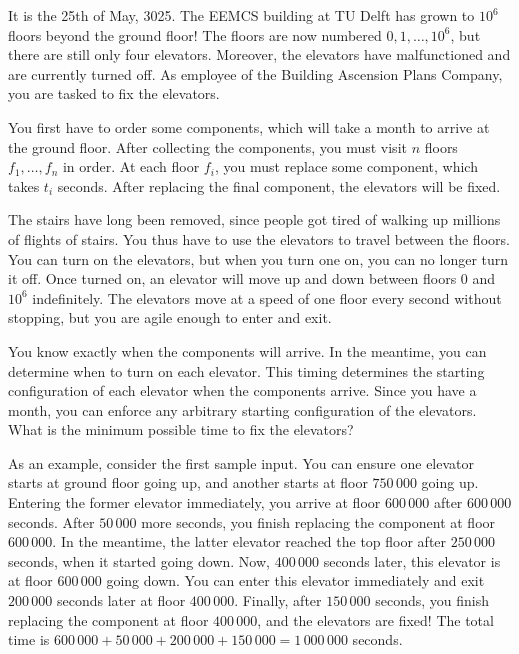 







It is the 25th of May, 3025.
The EEMCS building at TU Delft has grown to $10^6$ floors beyond the ground floor!
The floors are now numbered $0,1,\ldots,10^6$, but there are still only four elevators.
Moreover, the elevators have malfunctioned and are currently turned off.
As employee of the Building Ascension Plans Company, you are tasked to fix the elevators.

You first have to order some components, which will take a month to arrive at the ground floor.
After collecting the components, you must visit $n$ floors $f_1,\ldots,f_n$ in order.
At each floor $f_i$, you must replace some component, which takes $t_i$ seconds.
After replacing the final component, the elevators will be fixed.

The stairs have long been removed, since people got tired of walking up millions of flights of stairs.
You thus have to use the elevators to travel between the floors.
You can turn on the elevators, but when you turn one on, you can no longer turn it off.
Once turned on, an elevator will move up and down between floors $0$ and $10^6$ indefinitely.
The elevators move at a speed of one floor every second without stopping, but you are agile enough to enter and exit.

You know exactly when the components will arrive.
In the meantime, you can determine when to turn on each elevator.
This timing determines the starting configuration of each elevator when the components arrive.
Since you have a month, you can enforce any arbitrary starting configuration of the elevators.
What is the minimum possible time to fix the elevators?

As an example, consider the first sample input.
You can ensure one elevator starts at ground floor going up, and another starts at floor $750\,000$ going up.
Entering the former elevator immediately, you arrive at floor $600\,000$ after $600\,000$ seconds.
After $50\,000$ more seconds, you finish replacing the component at floor $600\,000$.
In the meantime, the latter elevator reached the top floor after $250\,000$ seconds, when it started going down.
Now, $400\,000$ seconds later, this elevator is at floor $600\,000$ going down.
You can enter this elevator immediately and exit $200\,000$ seconds later at floor $400\,000$.
Finally, after $150\,000$ seconds, you finish replacing the component at floor $400\,000$, and the elevators are fixed!
The total time is $600\,000+50\,000+200\,000+150\,000=1\,000\,000$ seconds.

